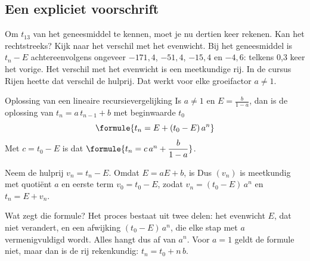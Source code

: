 
\begin{oefeningen}
\end{oefeningen}

\subsection{Een expliciet voorschrift}

Om $t_{13}$ van het geneesmiddel te kennen, moet je nu dertien keer rekenen. Kan het rechtstreeks? Kijk naar het verschil met het evenwicht. Bij het geneesmiddel is $t_n - E$ achtereenvolgens ongeveer $-171{,}4$, $-51{,}4$, $-15{,}4$ en $-4{,}6$: telkens 0,3 keer het vorige. Het verschil met het evenwicht is een meetkundige rij. In de cursus Rijen heette dat verschil de hulprij. Dat werkt voor elke groeifactor $a \neq 1$.

\begin{theorie}
\begin{stelling}{Oplossing van een lineaire recursievergelijking}
Is $a \neq 1$ en $E = \tfrac{b}{1 - a}$, dan is de oplossing van $t_n = a\, t_{n-1} + b$ met beginwaarde $t_0$
\[
\formule{t_n = E + (t_0 - E)\, a^n}
\]
Met $c = t_0 - E$ is dat $\formule{t_n = c\, a^n + \dfrac{b}{1 - a}}$.
\end{stelling}

\begin{bewijs}
Neem de hulprij $v_n = t_n - E$. Omdat $E = aE + b$, is
Dus $(v_n)$ is meetkundig met quotiënt $a$ en eerste term $v_0 = t_0 - E$, zodat $v_n = (t_0 - E)\,a^n$ en $t_n = E + v_n$.
\end{bewijs}
\end{theorie}

Wat zegt die formule? Het proces bestaat uit twee delen: het evenwicht $E$, dat niet verandert, en een afwijking $(t_0 - E)\,a^n$, die elke stap met $a$ vermenigvuldigd wordt. Alles hangt dus af van $a^n$. Voor $a = 1$ geldt de formule niet, maar dan is de rij rekenkundig: $t_n = t_0 + n\,b$.


